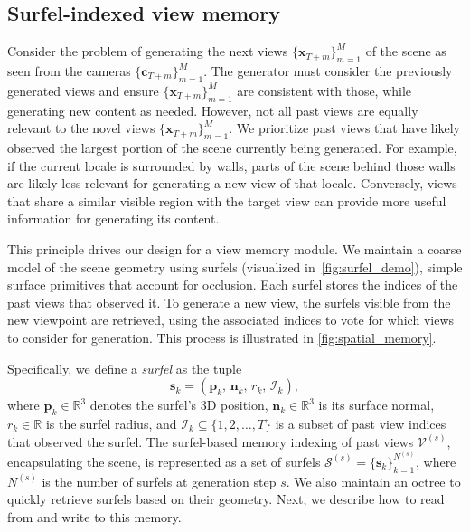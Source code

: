 \subsection{Surfel-indexed view memory}%
\label{sec:spatial_mem}

Consider the problem of generating the next views $\{\mathbf{x}_{T+m}\}_{m=1}^M$ of the scene as seen from the cameras $\{\mathbf{c}_{T+m}\}_{m=1}^M$.
The generator must consider the previously generated views and ensure $\{\mathbf{x}_{T+m}\}_{m=1}^M$ are consistent with those, while generating new content as needed.
However, not all past views are equally relevant to the novel views $\{\mathbf{x}_{T+m}\}_{m=1}^M$.
We prioritize past views that have likely observed the largest portion of the scene currently being generated.
For example, if the current locale is surrounded by walls, parts of the scene behind those walls are likely less relevant for generating a new view of that locale.
Conversely, views that share a similar visible region with the target view can provide more useful information for generating its content.

This principle drives our design for a view memory module.
We maintain a coarse model of the scene geometry using surfels (visualized in~\cref{fig:surfel_demo}), simple surface primitives that account for occlusion.
Each surfel stores the indices of the past views that observed it.
To generate a new view, the surfels visible from the new viewpoint are retrieved, using the associated indices to vote for which views to consider for generation.
This process is illustrated in \cref{fig:spatial_memory}.

Specifically, we define a \emph{surfel} as the tuple
\[
\mathbf{s}_k = \left(\mathbf{p}_k,\, \mathbf{n}_k,\, r_k,\, \mathcal{I}_k\right),
\]
where \(\mathbf{p}_k \in \mathbb{R}^3\) denotes the surfel's 3D position, \(\mathbf{n}_k \in \mathbb{R}^3\) is its surface normal, \(r_k \in \mathbb{R}\) is the surfel radius, and \(\mathcal{I}_k \subseteq \{1, 2, \ldots, T\} \) is a subset of past view indices that observed the surfel.
The surfel-based memory indexing of past views $\mathcal{V}^{(s)}$, encapsulating the scene, is represented as a set of surfels $\mathcal{S}^{(s)} = \{\mathbf{s}_k\}_{k=1}^{N^{(s)}}$, where $N^{(s)}$ is the number of surfels at generation step $s$.
We also maintain an octree to quickly retrieve surfels based on their geometry.
Next, we describe how to read from and write to this memory.



